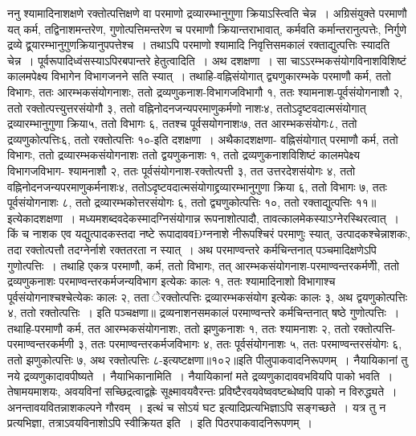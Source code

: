 ननु श्यामादिनाशक्षणे रक्तोत्पत्तिक्षणे वा परमाणो द्रव्यारम्भानुगुणा क्रियाऽस्त्विति चेन्न~। अग्रिसंयुक्ते परमाणौ यत् कर्म, तद्विनाशमन्तरेण, गुणोत्पत्तिमन्तरेण च
परमाणौ क्रियान्तराभावात्, कर्मवति कर्मान्तरानुत्पत्तेः, निर्गुणे द्रव्ये द्व्र्यारम्भानुगुणक्रियानुपपत्तेश्च~। तथाऽपि परमाणो श्यामादि निवृत्तिसमकालं रक्ताद्युत्पत्तिः स्यादति
चेन्न~। पूर्वरूपादिध्वंसस्याऽपिरबपान्तरे हेतुत्वादिति~।
अथ दशक्षणा~।
सा चाऽऽरम्भकसंयोगविनाशविशिष्टं कालमपेक्ष्य विभागेन विभागजनने सति स्यात्~। तथाहि-वह्निसंयोगात् द्व्यणुकारम्भके परमाणौ कर्म, ततो विभागः, ततः
आरम्भकसंयोगनाशः, ततो द्रव्यणुकनाश-विभागजविभागौ १, ततः श्यामनाश-पूर्वसंयोगनाशौ २, ततो रक्तोत्पत्त्युत्तरसंयोगौ ३, ततो वह्निनोदनजन्यपरमाणुकर्मणो
नाशः४, ततोऽदृष्टवदात्मसंयोगात् द्रव्यारम्भानुगुणा क्रिया५, ततो विभागः ६, ततश्च पूर्वसयोगनाशः७, तत आरम्भकसंयोगः८, ततो द्रव्यणुकोत्पत्तिः६, ततो रक्तोत्पत्तिः
१०-इति दशक्षणा~। अथैकादशक्षणा-
वह्निसंयोगात् परमाणौ कर्म, ततो विभागः, ततो द्रव्यारम्भकसंयोगनाशः ततो द्वयणुकनाशः १, ततो द्रव्यणुकनाशविशिष्टं कालमपेक्ष्य विभागजविभाग-
श्यामनाशौ २, ततः पूर्वसंयोगनाश-रक्तोत्पत्ती ३, तत उत्तरदेशसंयोगः ४, ततो वह्निनोदनजन्यपरमाणुकर्मनाशः४, ततोऽदृष्टवदात्मसंयोगाद्द्रव्यारम्भानुगुणा क्रिया ६,
ततो विभागः ७, ततः पूर्वसंयोगनाशः ८, ततो द्रव्यारम्भकोत्तरसंयोगः ६, ततो द्व्यणुकोत्पत्तिः १०, ततो रक्ताद्युत्पत्तिः ११॥इत्येकादशक्षणा~।
मध्यमशब्दवदेकस्मादग्निसंयोगान्न रूपनाशोत्पादौ, तावत्कालमेकस्याऽग्नेरस्थिरत्वात्~। किं च नाशक एव यद्युत्पादकस्तदा नष्टे रूपादाववÐग्ननाशे नीरूपश्चिरं
परमाणुः स्यात्,
उत्पादकश्चेन्नाशकः, तदा रक्तोत्पत्तौ तदग्नेर्नाशे रक्ततरता न स्यात्~।
अथ परमाण्वन्तरे कर्मचिन्तनात् पञ्चमादिक्षणेऽपि गुणोत्पत्तिः~। तथाहि एकत्र परमाणौ, कर्म, ततो विभागः, तत् आरम्भकसंयोगनाश-परमाण्वन्तरकर्मणीे, ततो
द्रव्यणुकनाशः परमाण्वन्तरकर्मजन्यविभाग इत्येकः कालः १, ततः श्यामादिनाशो विभागाश्च पूर्वसंयोगनाश्चश्चेत्येकः कालः २, तता ेरक्तोत्पत्तिः द्रव्यारम्भकसंयोग
इत्येकः कालः ३, अथ द्वयणुकोत्पत्तिः ४, ततो रक्तोत्पत्तिः~। इति पञ्चक्षणा॥
द्रव्यनाशनसमकालं परमाण्वन्तरे कर्मचिन्तनात् षष्ठे गुणोत्पत्तिः~। तथाहि-परमाणौ कर्म, तत आरम्भकसंयोगनाशः, ततो झणुकनाशः १, ततः श्यामनाशः २, ततो
रक्तोत्पत्ति-परमाण्वन्तरकर्मणी ३, ततः परमाण्वन्तरकर्मजविभागः ४, ततः पूर्वसंयोगनाशः ५, ततः परमाण्वन्तरसंयोगः ६, ततो झणुकोत्पत्तिः ७, अथ रक्तोत्पत्तिः
८-इत्यष्टक्षणा॥१०२॥इति पीलुपाकवादनिरूपणम्~।
नैयायिकानां तु नये द्रव्यणुकादावपीष्यते~।
नैयाभिकानामिति~। नैयायिकानां मते द्रव्यणुकादाववभवियपि पाको भवति~।
तेषामयमाशयः, अवयविनां सच्छिद्रत्वाद्वह्रेः सूक्ष्मावयवैरन्तः प्रविष्टैरवयवेष्ववष्टब्धेष्वपि पाको न विरुद्ध्यते~। अनन्तावयवितन्नाशकल्पने गौरवम्~। इत्थं च सोऽयं
घट इत्यादिप्रत्यभिज्ञाऽपि सङ्गच्छते~। यत्र तु न प्रत्यभिज्ञा, तत्राऽवयविनाशोऽपि स्वीक्रियत इति~। इति पिठरपाकवादनिरूपणम्~।
